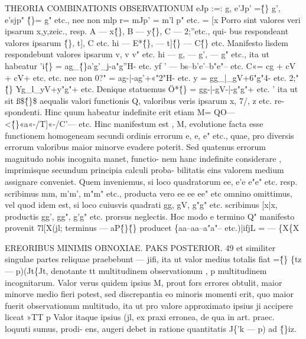 \documentclass[12pt,a4paper]{article}
\begin{document}
 THEORIA COMBINATIONIS OBSERVATIONUM
eJp :=: g, e'Jp' =\^\{\} g', e'sjp" \^\{\}= g" etc., nee non
mlp r= mJp' = m'l p" etc. = [x
Porro sint valores veri ipsarum x,y,zeic., resp. A --- x\^\{\}, B --- y\^\{\}, C --- 2;''etc., qui-
bus respondeant valores ipsarum \^\{\}, t], C etc. hi --- E*\^\{\}, --- t]\^\{\} --- C\^\{\} etc. Manifesto
lisdem respondebunt valores ipsarum v, v v" etc. hi --- g, --- g', --- g" etc., ita ut
habeatur
'i\^\{\} = ag\_\^\{\}a'g'\_j-a"g''H- etc.
yf ' --- bs--b'e'--b"e"-- etc.
C«= cg + cV + cV+ etc.
etc. nee non
0?" = ag-|-ag'+«"2"H- etc.
y = gg\_|\_gV+6"g"4- etc.
2;" \^\{\} Yg\_l\_yV+y"g"+ etc.
Denique statuemus
Ö*\^\{\} = gg-|-gV-|-g"g"+ etc. '
ita ut sit ß\$\^\{\}\circ\$ aequalis valori functionis Q, valoribus veris ipsarum x, 7/, z etc. re-
spondenti. Hinc quum habeatur indefinite
erit etiam
M= QO--- <\^\{\}«a«-/T]«-/C'--- etc.
Hinc manifestum est , M, evolutione facta esse functionem homogeneam secundi
ordinis errorum e, e, e" etc., quae, pro diversis errorum valoribus maior minorve
evadere poterit. Sed quatenus errorum magnitudo nobis incognita manet, functio-
nem hanc indefinite considerare , imprimisque secundum principia calculi proba-
bilitatis eins valorem medium assignare conveniet. Quem inveniemus, si loco
quadratorum ee, e'e e"e" etc. resp. scribimus mm, m'm', m"m" etc., producta vero
ee ee ee" etc omnino omittimus, vel quod idem est, si loco cuiusvis quadrati
gg, gV, g"g" etc. scribimus [x|x, productis gg', gg", g'g" etc. prorsus neglectis. Hoc
modo e termino Q" manifesto provenit 7l[X(jl; terminus --- aP\^\{\}\^\{\} producet
\{aa--aa--a"a"-- etc.)|ifjL = ---
\{X\{X

\newpage
EREORIBUS MINIMIS OBNOXIAE. PAKS POSTERIOR. 49
et similiter singulae partes reliquae praebebunt --- jifi, ita ut valor medius totalis
fiat =\^\{\} \{tz --- p)(Jt\{Jt, denotante tt multitudinem observationum , p multitudinem
incognitarum. Valor verus quidem ipsius M, prout fors errores obtulit, maior
minorve medio fieri potest, sed discrepantia eo minoris momenti erit, quo maior
fuerit observationum multitudo, ita ut pro valore approximato ipsius ji accipere
liceat
»TT p
Valor itaque ipsius (jl, ex praxi erronea, de qua in art. praec. loquuti sumus, prodi-
ens, augeri debet in ratione quantitatis J\{'k --- p) ad \^\{\}iz.
\end{document}
